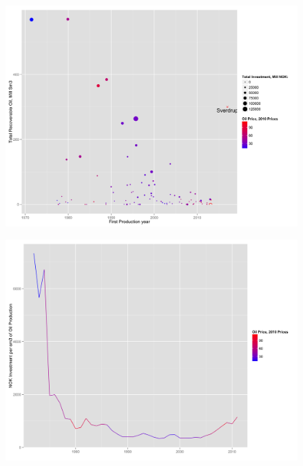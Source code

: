 \documentclass{beamer}
\begin{document}

\begin{frame}[plain]
	\begin{figure}
	\includegraphics[width=1\textwidth]{size_vs_init_prod.png}
	\end{figure}
\end{frame}


\begin{frame}[plain]
	\begin{figure}
	\includegraphics[width=1\textwidth]{invest_per_prod.png}
	\end{figure}
\end{frame}
\end{document}

